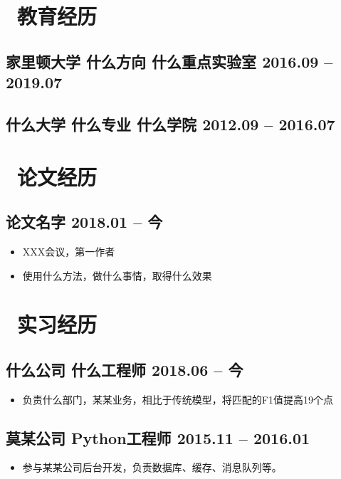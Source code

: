 \documentclass{style/resume}
\newcommand{\datestyle}[1]{
        \normalsize #1
    }
\newcommand{\education}[4]{
        \subsection[#1]{\textbf{#1} \hspace{\stretch{1}} \textbf{\normalsize #2} \hspace{2em} \textbf{\normalsize #3} \hspace{1em} \datestyle{#4}}
    }
\newcommand{\internhead}[3]{
        \subsection[#1]{\textbf{#1} \hspace{\stretch{1}} \textbf{\normalsize #2} \hspace{3em} \datestyle{#3}}
    }
\newcommand{\paperhead}[2]{
      \subsection[#1]{\normalsize \textbf{#1} \hspace{\stretch{1}} \datestyle{#2}}
  }
\begin{document}
    
    
    \vspace{-1em}
    \section{\faGraduationCap\ 教育经历}
   

    \education{家里顿大学}{什么方向}{什么重点实验室}{2016.09 -- 2019.07}

    \vspace{-6pt}

 

    \education{什么大学}{什么专业 \hspace{9.5em} }{什么学院}{2012.09 -- 2016.07}

    \section{\faGithubAlt\ 论文经历}
    \paperhead{论文名字}{2018.01 -- 今}
    \begin{itemize}
      \item XXX会议，第一作者
      \item 使用什么方法，做什么事情，取得什么效果
    \end{itemize}

  
    \section{\faUsers\ 实习经历}

    \internhead{什么公司}{什么工程师}{2018.06 -- 今}
    \begin{itemize}
      \item 负责什么部门，某某业务，相比于传统模型，将匹配的F1值提高19个点
    \end{itemize}

    \internhead{莫某公司}{Python工程师}{2015.11 -- 2016.01}
    \begin{itemize}
      \item 参与某某公司后台开发，负责数据库、缓存、消息队列等。
    \end{itemize}
\end{document}
